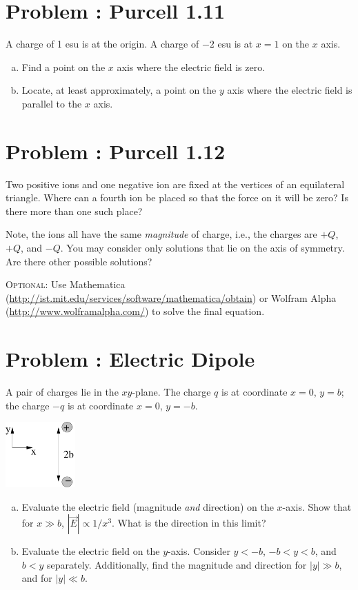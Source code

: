 \documentclass[problems]{esg8022pset}
\begin{document}
\section{Problem \thesection: Purcell 1.11}
  A charge of 1 esu is at the origin. A charge of $-2$ esu is at $x = 1$ on the $x$ axis.
  \begin{enumerate}[(a)]
    \item Find a point on the $x$ axis where the electric field is zero.
    \item Locate, at least approximately, a point on the $y$ axis where the electric field is parallel to the $x$ axis.
  \end{enumerate}
\section{Problem \thesection: Purcell 1.12}
  Two positive ions and one negative ion are fixed at the vertices of an equilateral triangle.  Where can a fourth ion be placed so that the force on it will be zero?  Is there more than one such place?

  Note, the ions all have the same \emph{magnitude} of charge, i.e., the charges are $+Q$, $+Q$, and $-Q$. You may consider only solutions that lie on the axis of symmetry. Are there other possible solutions?

  \textsc{Optional}: Use Mathematica (\url{http://ist.mit.edu/services/software/mathematica/obtain}) or Wolfram Alpha (\url{http://www.wolframalpha.com/}) to solve the final equation.
\section{Problem \thesection: Electric Dipole}
  A pair of charges lie in the $xy$-plane.  The charge $q$ is at coordinate $x = 0$, $y = b$; the charge $-q$ is at coordinate $x = 0$, $y = -b$.
  \begin{center}\includegraphics[width=0.2\textwidth]{ps01_8}\end{center}
  \begin{enumerate}[(a)]
    \item Evaluate the electric field (magnitude \emph{and} direction) on the $x$-axis.  Show that for $x \gg b$, $|\vec E| \propto 1 / x^3$.  What is the direction in this limit?
    \item Evaluate the electric field on the $y$-axis.  Consider $y < -b$, $-b < y < b$, and $b < y$ separately.  Additionally, find the magnitude and direction for $|y| \gg b$, and for $|y| \ll b$.
  \end{enumerate}
\end{document}
